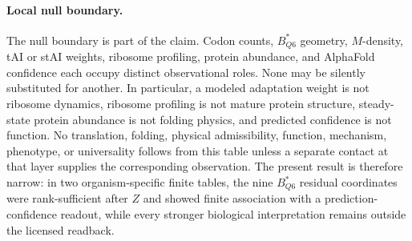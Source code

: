 \paragraph{Local null boundary.}
The null boundary is part of the claim. Codon counts, $B^*_{Q6}$ geometry, $M$-density, tAI or stAI weights, ribosome profiling, protein abundance, and AlphaFold confidence each occupy distinct observational roles. None may be silently substituted for another. In particular, a modeled adaptation weight is not ribosome dynamics, ribosome profiling is not mature protein structure, steady-state protein abundance is not folding physics, and predicted confidence is not function. No translation, folding, physical admissibility, function, mechanism, phenotype, or universality follows from this table unless a separate contact at that layer supplies the corresponding observation. The present result is therefore narrow: in two organism-specific finite tables, the nine $B^*_{Q6}$ residual coordinates were rank-sufficient after $Z$ and showed finite association with a prediction-confidence readout, while every stronger biological interpretation remains outside the licensed readback.

